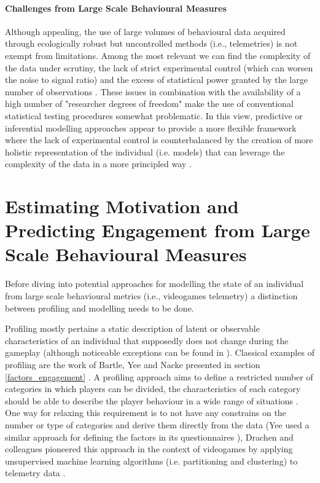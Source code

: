 \paragraph*{Challenges from Large Scale Behavioural Measures}
\label{challenges_large_scale}
Although appealing, the use of large volumes of behavioural data acquired through ecologically robust but uncontrolled methods (i.e., telemetries) is not exempt from limitations. Among the most relevant we can find the complexity of the data under scrutiny, the lack of strict experimental control (which can worsen the noise to signal ratio) and the excess of statistical power granted by the large number of observations \cite{orben2019association}. These issues in combination with the availability of a high number of "researcher degrees of freedom" \cite{simmons2016false} make the use of conventional statistical testing procedures somewhat problematic. In this view, predictive or inferential modelling approaches appear to provide a more flexible framework where the lack of experimental control is counterbalanced by the creation of more holistic representation of the individual (i.e. models) that can leverage the complexity of the data in a more principled way \cite{yannakakis2013player}.

\section{Estimating Motivation and Predicting Engagement from Large Scale Behavioural Measures}
\label{estpred_motivation_engagement}
Before diving into potential approaches for modelling the state of an individual from large scale behavioural metrics (i.e., videogames telemetry) a distinction between profiling and modelling needs to be done. 

Profiling mostly pertains a static description of latent or observable characteristics of an individual that supposedly does not change during the gameplay \cite{yannakakis2013player} (although noticeable exceptions can be found in \cite{sifa2013behavior, pirker2016playstyles, aung2018predicting}). Classical examples of profiling are the work of Bartle, Yee and Nacke presented in section \ref{factors_engagement} \cite{bartle1996hearts, yee2006motivations, nacke2011brainhex}. A profiling approach aims to define a restricted number of categories in which players can be divided, the characteristics of each category should be able to describe the player behaviour in a wide range of situations \cite{yannakakis2013player, van2009psychologically, van2011games}. One way for relaxing this requirement is to not have any constrains on the number or type of categories and derive them directly from the data (Yee used a similar approach for defining the factors in its questionnaires \cite{yee2006motivations}), Drachen and colleagues pioneered this approach in the context of videogames by applying unsupervised machine learning algorithms (i.e. partitioning and clustering) to telemetry data \cite{tychsen2008defining,drachen2009player, drachen2012guns}. 


